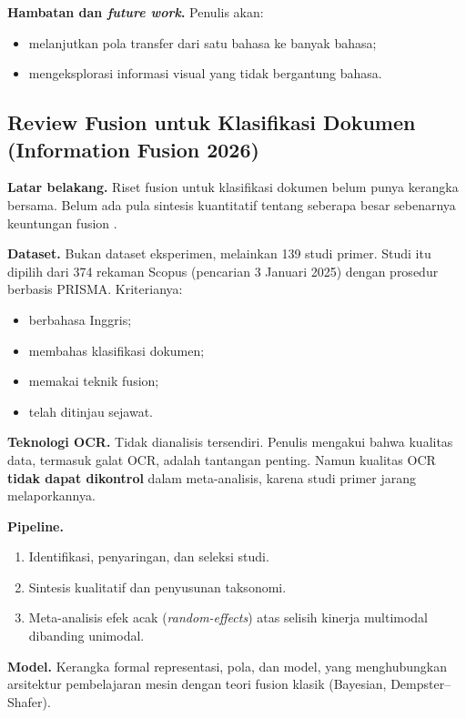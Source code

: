 \textbf{Hambatan dan \textit{future work}.} Penulis akan:
\begin{itemize}
  \item melanjutkan pola transfer dari satu bahasa ke banyak bahasa;
  \item mengeksplorasi informasi visual yang tidak bergantung bahasa.
\end{itemize}

\subsection{Review Fusion untuk Klasifikasi Dokumen (Information Fusion 2026)}
\label{sec:mironczuk}

\textbf{Latar belakang.} Riset fusion untuk klasifikasi dokumen belum punya kerangka
bersama. Belum ada pula sintesis kuantitatif tentang seberapa besar sebenarnya keuntungan
fusion \parencite{mironczuk2026}.

\textbf{Dataset.} Bukan dataset eksperimen, melainkan 139 studi primer. Studi itu dipilih
dari 374 rekaman Scopus (pencarian 3 Januari 2025) dengan prosedur berbasis PRISMA.
Kriterianya:
\begin{itemize}
  \item berbahasa Inggris;
  \item membahas klasifikasi dokumen;
  \item memakai teknik fusion;
  \item telah ditinjau sejawat.
\end{itemize}

\textbf{Teknologi OCR.} Tidak dianalisis tersendiri. Penulis mengakui bahwa kualitas data,
termasuk galat OCR, adalah tantangan penting. Namun kualitas OCR \textbf{tidak dapat
dikontrol} dalam meta-analisis, karena studi primer jarang melaporkannya.

\textbf{Pipeline.}
\begin{enumerate}
  \item Identifikasi, penyaringan, dan seleksi studi.
  \item Sintesis kualitatif dan penyusunan taksonomi.
  \item Meta-analisis efek acak (\textit{random-effects}) atas selisih kinerja
  multimodal dibanding unimodal.
\end{enumerate}

\textbf{Model.} Kerangka formal representasi, pola, dan model, yang menghubungkan arsitektur
pembelajaran mesin dengan teori fusion klasik (Bayesian, Dempster--Shafer).

